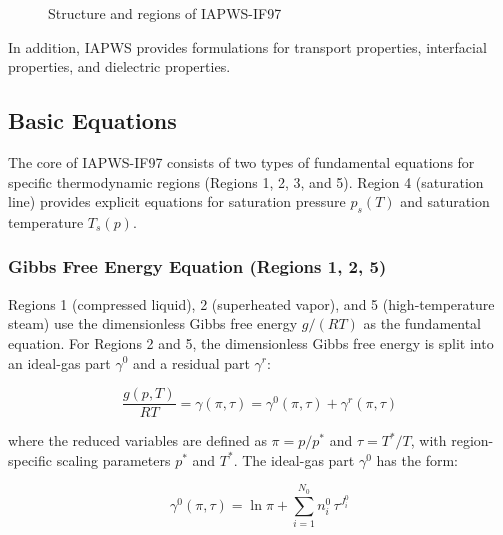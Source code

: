 \documentclass{article}
\begin{document}
\begin{figure}[H]
\caption{Structure and regions of IAPWS-IF97}
\label{fig:if97_regions}
\end{figure}

In addition, IAPWS \cite{IAPWS-Releases} provides formulations for transport properties, interfacial properties, and dielectric properties.

\subsection{Basic Equations}

The core of IAPWS-IF97 consists of two types of fundamental equations  for specific thermodynamic regions (Regions 1, 2, 3, and 5). Region 4 (saturation line) provides explicit equations for saturation pressure $p_s(T)$ and saturation temperature $T_s(p)$.

\subsubsection{Gibbs Free Energy Equation (Regions 1, 2, 5)}

Regions 1 (compressed liquid), 2 (superheated vapor), and 5 (high-temperature steam) use the dimensionless Gibbs free energy $g/(RT)$ as the fundamental equation. For Regions 2 and 5, the dimensionless Gibbs free energy is split into an ideal-gas part $\gamma^0$ and a residual part $\gamma^r$:

\begin{equation}
\frac{g(p,T)}{RT} = \gamma(\pi,\tau) = \gamma^0(\pi,\tau) + \gamma^r(\pi,\tau)
\label{eq:gibbs}
\end{equation}

where the reduced variables are defined as $\pi = p/p^{*}$ and $\tau = T^{*}/T$, with region-specific scaling parameters $p^{*}$ and $T^{*}$. The ideal-gas part $\gamma^0$ has the form:

\begin{equation}
\gamma^0(\pi,\tau) = \ln\pi + \sum_{i=1}^{N_0} n_i^0 \, \tau^{J_i^0}
\label{eq:gibbs_ideal}
\end{equation}
\end{document}
